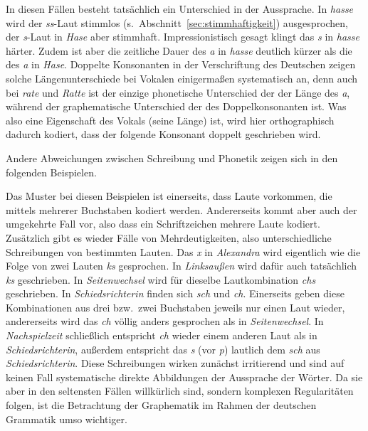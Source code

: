 In diesen Fällen besteht tatsächlich ein Unterschied in der Aussprache.
In \textit{hasse} wird der \textit{ss}-Laut stimmlos (s.\ Abschnitt~\ref{sec:stimmhaftigkeit}) ausgesprochen, der \textit{s}-Laut in \textit{Hase} aber stimmhaft.
Impressionistisch gesagt klingt das \textit{s} in \textit{hasse} härter.
Zudem ist aber die zeitliche Dauer des \textit{a} in \textit{hasse} deutlich kürzer als die des \textit{a} in \textit{Hase}.
Doppelte Konsonanten in der Verschriftung des Deutschen zeigen solche Längenunterschiede bei Vokalen einigermaßen systematisch an, denn auch bei \textit{rate} und \textit{Ratte} ist der einzige phonetische Unterschied der der Länge des \textit{a}, während der graphematische Unterschied der des Doppelkonsonanten ist.
Was also eine Eigenschaft des Vokals (seine Länge) ist, wird hier orthographisch dadurch kodiert, dass der folgende Konsonant doppelt geschrieben wird.

Andere Abweichungen zwischen Schreibung und Phonetik zeigen sich in den folgenden Beispielen.

\begin{exe}
  \ex
  \begin{xlist}
  \end{xlist}
\end{exe}

Das Muster bei diesen Beispielen ist einerseits, dass Laute vorkommen, die mittels mehrerer Buchstaben kodiert werden.
Andererseits kommt aber auch der umgekehrte Fall vor, also dass ein Schriftzeichen mehrere Laute kodiert.
Zusätzlich gibt es wieder Fälle von Mehrdeutigkeiten, also unterschiedliche Schreibungen von bestimmten Lauten.
Das \textit{x} in \textit{Alexandra} wird eigentlich wie die Folge von zwei Lauten \textit{ks} gesprochen.
In \textit{Linksaußen} wird dafür auch tatsächlich \textit{ks} geschrieben.
In \textit{Seitenwechsel} wird für dieselbe Lautkombination \textit{chs} geschrieben.
In \textit{Schiedsrichterin} finden sich \textit{sch} und \textit{ch}.
Einerseits geben diese Kombinationen aus drei bzw.\ zwei Buchstaben jeweils nur einen Laut wieder, andererseits wird das \textit{ch} völlig anders gesprochen als in \textit{Seitenwechsel}.
In \textit{Nachspielzeit} schließlich entspricht \textit{ch} wieder einem anderen Laut als in \textit{Schiedsrichterin}, außerdem entspricht das \textit{s} (vor \textit{p}) lautlich dem \textit{sch} aus \textit{Schiedsrichterin}.
Diese Schreibungen wirken zunächst irritierend und sind auf keinen Fall systematische direkte Abbildungen der Aussprache der Wörter.
Da sie aber in den seltensten Fällen willkürlich sind, sondern komplexen Regularitäten folgen, ist die Betrachtung der Graphematik im Rahmen der deutschen Grammatik umso wichtiger.

